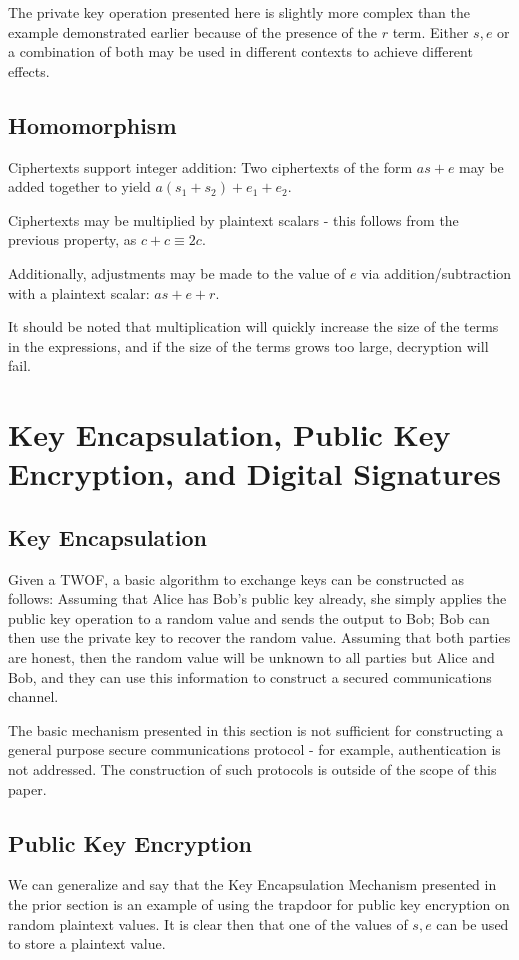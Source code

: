 \documentclass[preprint]{iacrtrans}
\begin{document}
The private key operation presented here is slightly more complex than the example demonstrated earlier because of the presence of the $r$ term. Either $s, e$ or a combination of both may be used in different contexts to achieve different effects.

\subsection{Homomorphism}
Ciphertexts support integer addition: Two ciphertexts of the form $a s + e$ may be added together to yield $a (s_1 + s_2) + e_1 + e_2$. 

Ciphertexts may be multiplied by plaintext scalars - this follows from the previous property, as $c + c \equiv 2c$.

Additionally, adjustments may be made to the value of $e$ via addition/subtraction with a plaintext scalar: $a s + e + r$.

It should be noted that multiplication will quickly increase the size of the terms in the expressions, and if the size of the terms grows too large, decryption will fail.

\section{Key Encapsulation, Public Key Encryption, and Digital Signatures}
\subsection{Key Encapsulation}
Given a TWOF, a basic algorithm to exchange keys can be constructed as follows: Assuming that Alice has Bob's public key already, she simply applies the public key operation to a random value and sends the output to Bob; Bob can then use the private key to recover the random value. Assuming that both parties are honest, then the random value will be unknown to all parties but Alice and Bob, and they can use this information to construct a secured communications channel.

The basic mechanism presented in this section is not sufficient for constructing a general purpose secure communications protocol - for example, authentication is not addressed. The construction of such protocols is outside of the scope of this paper. 

\subsection{Public Key Encryption}
We can generalize and say that the Key Encapsulation Mechanism presented in the prior section is an example of using the trapdoor for public key encryption on random plaintext values. It is clear then that one of the values of $s, e$ can be used to store a plaintext value.
\end{document}
